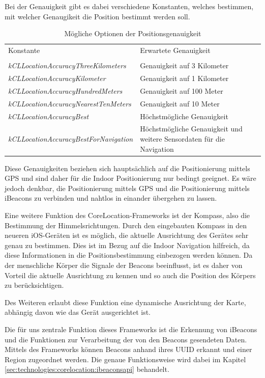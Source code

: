 Bei der Genauigkeit gibt es dabei verschiedene Konstanten, welches bestimmen, mit welcher Genaugikeit die Position bestimmt werden soll. 


    \begin{table}[htb!]
      \centering
      \begin{tabular}{l p{6cm}}
        Konstante & Erwartete Genauigkeit \\ \\
		\emph{kCLLocationAccuracyThreeKilometers} & Genauigkeit auf 3 Kilometer \\
		\emph{kCLLocationAccuracyKilometer} & Genauigkeit auf 1 Kilometer \\
		\emph{kCLLocationAccuracyHundredMeters} & Genauigkeit auf 100 Meter \\
		\emph{kCLLocationAccuracyNearestTenMeters} & Genauigkeit auf 10 Meter \\
		\emph{kCLLocationAccuracyBest} & Höchstmögliche Genauigkeit \\
		\emph{kCLLocationAccuracyBestForNavigation} & Höchstmögliche Genauigkeit und weitere Sensordaten für die Navigation
      \end{tabular}
      \caption{Mögliche Optionen der Positionsgenauigkeit}
      \label{tbl:positionaccuracy}
    \end{table}
	
Diese Genauigkeiten beziehen sich hauptsächlich auf die Positionierung mittels GPS und sind daher für die Indoor Positionierung nur bedingt geeignet. Es wäre jedoch denkbar, die Positionierung mittels GPS und die Positionierung mittels iBeacons zu verbinden und nahtlos in einander übergehen zu lassen.

Eine weitere Funktion des CoreLocation-Frameworks ist der Kompass, also die Bestimmung der Himmelsrichtungen. Durch den eingebauten Kompass in den neueren iOS-Geräten ist es möglich, die aktuelle Ausrichtung des Gerätes sehr genau zu bestimmen. Dies ist im Bezug auf die Indoor Navigation hilfreich, da diese Informationen in die Positionsbestimmung einbezogen werden können. Da der menschliche Körper die Signale der Beacons beeinflusst, ist es daher von Vorteil die aktuelle Ausrichtung zu kennen und so auch die Position des Körpers zu berücksichtigen.

Des Weiteren erlaubt diese Funktion eine dynamische Ausrichtung der Karte, abhängig davon wie das Gerät ausgerichtet ist.

Die für uns zentrale Funktion dieses Frameworks ist die Erkennung von iBeacons und die Funktionen zur Verarbeitung der von den Beacons gesendeten Daten.
Mittels des Frameworks können Beacons anhand ihres UUID erkannt und einer Region zugeordnet werden. Die genaue Funktionsweise wird dabei im Kapitel \ref{sec:technologies:corelocation:ibeaconsapi} behandelt.

